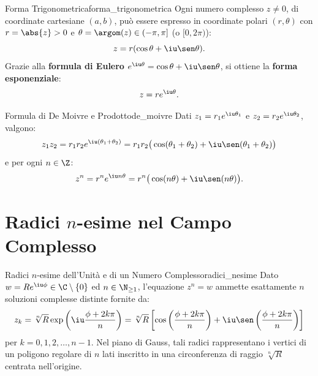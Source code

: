\begin{definizione}{Forma Trigonometrica}{forma_trigonometrica}
Ogni numero complesso $z \neq 0$, di coordinate cartesiane $(a, b)$, può essere espresso in coordinate polari $(r, \theta)$ con $r = \abs{z} > 0$ e $\theta = \argom(z) \in (-\pi, \pi]$ (o $[0, 2\pi)$):
\begin{equation}
    z = r(\cos\theta + \iu\sen\theta).
\end{equation}
Grazie alla \textbf{formula di Eulero} $e^{\iu\theta} = \cos\theta + \iu\sen\theta$, si ottiene la \textbf{forma esponenziale}:
\begin{equation}
    z = r e^{\iu\theta}.
\end{equation}
\end{definizione}

\begin{teorema}{Formula di De Moivre e Prodotto}{de_moivre}
Dati $z_1 = r_1 e^{\iu\theta_1}$ e $z_2 = r_2 e^{\iu\theta_2}$, valgono:
\begin{equation}
    z_1 z_2 = r_1 r_2 e^{\iu(\theta_1 + \theta_2)} = r_1 r_2 \big(\cos(\theta_1 + \theta_2) + \iu\sen(\theta_1 + \theta_2)\big)
\end{equation}
e per ogni $n \in \Z$:
\begin{equation}
    z^n = r^n e^{\iu n\theta} = r^n \big(\cos(n\theta) + \iu\sen(n\theta)\big).
\end{equation}
\end{teorema}

\section{Radici \texorpdfstring{$n$}{n}-esime nel Campo Complesso}

\begin{teorema}{Radici \texorpdfstring{$n$}{n}-esime dell'Unità e di un Numero Complesso}{radici_nesime}
Dato $w = R e^{\iu\phi} \in \C \setminus \{0\}$ ed $n \in \N_{\ge 1}$, l'equazione $z^n = w$ ammette esattamente $n$ soluzioni complesse distinte fornite da:
\begin{equation}
    z_k = \sqrt[n]{R} \exp\left(\iu \frac{\phi + 2k\pi}{n}\right) = \sqrt[n]{R}\left[\cos\left(\frac{\phi + 2k\pi}{n}\right) + \iu\sen\left(\frac{\phi + 2k\pi}{n}\right)\right]
\end{equation}
per $k = 0, 1, 2, \dots, n-1$.
Nel piano di Gauss, tali radici rappresentano i vertici di un poligono regolare di $n$ lati inscritto in una circonferenza di raggio $\sqrt[n]{R}$ centrata nell'origine.
\end{teorema}

